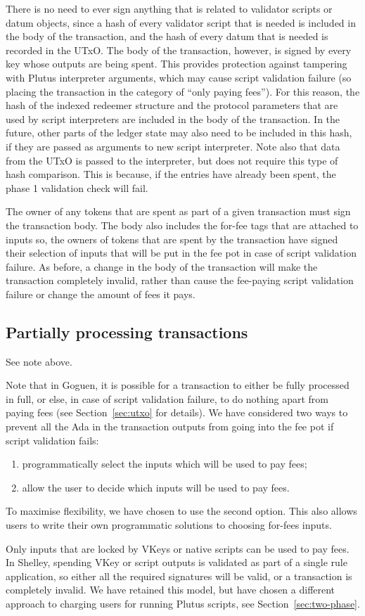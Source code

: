 There is no need to ever sign anything that is related to validator scripts or datum objects,
since a hash of every validator script that is needed
is included in the body of the transaction, and the hash of every datum that is needed
is recorded in the UTxO.
%
The body of the transaction, however, is signed by every key
whose outputs are being spent.
This provides
protection against tampering with Plutus interpreter arguments, which may cause
script validation failure (so placing the transaction in the category of ``only paying fees'').
For this reason, the hash of the indexed redeemer structure and the protocol parameters that are used by
script interpreters are included in the body of the transaction. In the future, other parts of the ledger
state may also need to be included in this hash, if they are passed as
arguments to new script interpreter. Note also that data from the UTxO
is passed to the interpreter, but does not require this type of hash comparison.
This is because, if the entries
have already been spent, the phase 1 validation check will fail.

The owner of any tokens that are spent as part of a given transaction
must sign the transaction body. The body also includes the for-fee tags that are attached to inputs so,
the owners of tokens that are spent by the transaction have
signed their selection of inputs that will be put in the fee pot in case of script validation failure.
As before, a change in the body of the transaction
will make the transaction completely invalid, rather than cause the fee-paying script validation
failure or change the amount of fees it pays.

\subsection{Partially processing transactions}
\begin{note}
  See note above.
\end{note}
Note that in Goguen, it is possible for a transaction
to either be fully processed in full, or else, in case of script validation failure,
to do nothing apart from paying fees (see Section~\ref{sec:utxo} for details).
We have considered two ways to prevent all the Ada in the transaction outputs from going into
the fee pot if script validation fails:
%
\begin{enumerate}
  \item programmatically select the inputs which will be used to pay fees;
  \item allow the user to decide which inputs will be used to pay fees.
\end{enumerate}
%
To maximise flexibility, we have chosen to use the second option.
This also allows users to write their own programmatic solutions to choosing for-fees inputs.

Only inputs that are locked by VKeys or native scripts can
be used to pay fees. In Shelley, spending VKey or script outputs is
validated as part of a single rule application, so either all
the required signatures will be valid, or a transaction is completely
invalid. We have retained this model, but have chosen a different approach to
charging users for running Plutus scripts, see
Section~\ref{sec:two-phase}.
